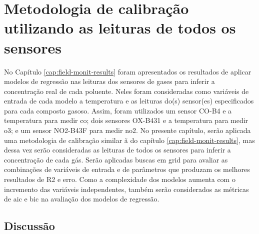 
\chapter{Metodologia de calibração utilizando as leituras de todos os sensores}\label{cap:calib-methodology}

No Capítulo \ref{cap:field-monit-results} foram apresentados os resultados de aplicar modelos de regressão nas leituras dos sensores de gases para inferir a concentração real de cada poluente. Neles foram consideradas como variáveis de entrada de cada modelo a temperatura e as leituras do(s) sensor(es) especificados para cada composto gasoso. Assim, foram utilizados um sensor CO-B4 e a temperatura para medir \acrshort{co}; dois sensores OX-B431 e a temperatura para medir \acrshort{o3}; e um sensor NO2-B43F para medir \acrshort{no2}. No presente capítulo, serão aplicada uma metodologia de calibração similar ã do capítulo \ref{cap:field-monit-results}, mas dessa vez serão consideradas as leituras de todos os sensores para inferir a concentração de cada gás. Serão aplicadas buscas em grid para avaliar as combinações de variáveis de entrada e de parâmetros que produzam os melhores resultados de R2 e erro. Como a complexidade dos modelos aumenta com o incremento das variáveis independentes, também serão considerados as métricas de \acrshort{aic} e \acrshort{bic} na avaliação dos modelos de regressão.









\section{Discussão}